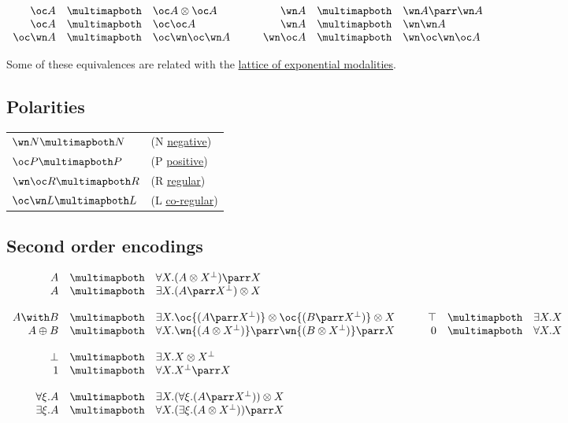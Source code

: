 \(\begin{array}{rclcrcl}
  \oc A & \linequiv&  \oc A\tens\oc A & \quad&  
  \wn A & \linequiv&  \wn A\parr\wn A\\
  \oc A & \linequiv&  \oc\oc A & \quad&  \wn A & \linequiv&  \wn\wn A\\
  \oc\wn A & \linequiv&  \oc\wn\oc\wn A & \quad&  \wn\oc A & \linequiv&  \wn\oc\wn\oc A\\
\end{array}\)

Some of these equivalences are related with the
\hyperref[lattice-of-exponential-modalities]{lattice of exponential modalities}.

\subsection{Polarities}\label{polarities}

\begin{longtable}[]{@{}ll@{}}
\toprule
\(\wn N \linequiv N\) & (N \hyperref[negative-formula]{negative})\tabularnewline
\(\oc P \linequiv P\) & (P \hyperref[positive-formula]{positive})\tabularnewline
\(\wn\oc R \linequiv R\) & (R \hyperref[regular-formula]{regular})\tabularnewline
\(\oc\wn L \linequiv L\) & (L \hyperref[regular-formula]{co-regular})\tabularnewline
\bottomrule
\end{longtable}

\subsection{Second order encodings}\label{second-order-encodings}

\(\begin{array}{rclcrcl}
  A & \linequiv & \forall X . (A \tens X\orth) \parr X \\
  A & \linequiv & \exists X . (A \parr X\orth) \tens X \\
\\
  A \with B & \linequiv&  \exists X . \oc{(A \parr X\orth)} \tens \oc{(B \parr X\orth)} \tens X & \quad&  \top & \linequiv&  \exists X . X \\
  A \plus B & \linequiv&  \forall X . \wn{(A \tens X\orth)} \parr \wn{(B \tens X\orth)} \parr X & \quad&  \zero & \linequiv&  \forall X . X \\
\\
 \bot & \linequiv&  \exists X . X\tens X\orth \\
 \one & \linequiv&  \forall X . X\orth\parr X \\
\\
  \forall \xi . A & \linequiv&  \exists X . (\forall \xi . (A \parr X\orth)) \tens X \\
  \exists \xi . A & \linequiv&  \forall X . (\exists \xi . (A \tens X\orth)) \parr X
\end{array}\)

